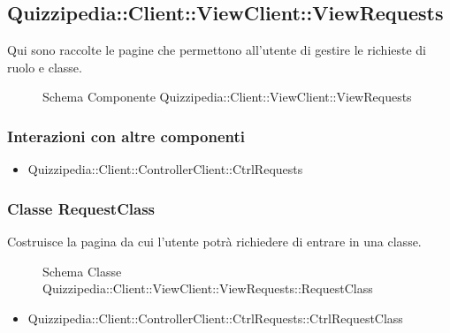 \subsection{Quizzipedia::Client::ViewClient::ViewRequests}
Qui sono raccolte le pagine che permettono all'utente di gestire le richieste di ruolo e classe.
\begin{figure}[H]
\centering
\noindent{}
\caption[Schema Componente Quizzipedia::Client::ViewClient::ViewRequests]{Schema Componente Quizzipedia::Client::ViewClient::ViewRequests}
\end{figure}
\subsubsection{Interazioni con altre componenti}
\begin{itemize}
\item Quizzipedia::Client::ControllerClient::CtrlRequests
\end{itemize}
\subsubsection{Classe RequestClass}
Costruisce la pagina da cui l'utente potrà richiedere di entrare in una classe.
\begin{figure}[H]
\centering
\noindent{}
\caption[Schema Classe RequestClass]{Schema Classe Quizzipedia::Client::ViewClient::ViewRequests::RequestClass}
\end{figure}
\begin{itemize}
\item Quizzipedia::Client::ControllerClient::CtrlRequests::CtrlRequestClass
\end{itemize}
